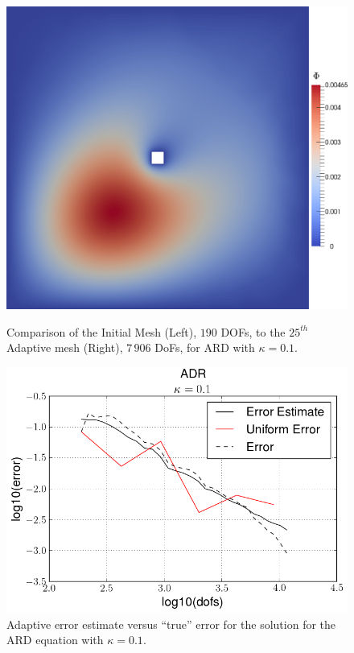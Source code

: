 \begin{test}[Diffusion Dominated ARD, $\kappa = 0.1$]
\begin{figure}[h]
\begin{minipage}[t]{0.49\textwidth}
{                \includegraphics[scale=0.1]{Figures/AdaptiveADRkappa1E-1_uDual25.png}
            }
        \end{minipage}
        \caption{Comparison of the Initial Mesh (Left), $190$ DOFs, to the
                 $25^{th}$ Adaptive mesh (Right), $7\, 906$ DoFs, for ARD with
                 $\kappa=0.1$.}
    \end{figure}

    \begin{figure}[h]
        \centering
        \includegraphics[scale=0.5]{Figures/AdaptiveADRkappa1E-1.png}
        \caption{Adaptive error estimate versus ``true'' error for the solution
            for the ARD equation with $\kappa=0.1$.}
        \label{fig:ADRk1E-1_err}
    \end{figure}
\end{test}

